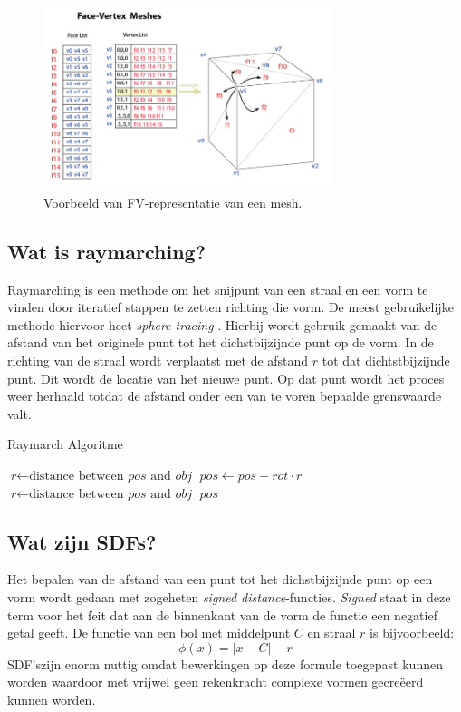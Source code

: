 \documentclass[12pt, a4paper]{article}
\begin{document}
\begin{figure}[H]
    \centering
    \includegraphics[width=0.75\textwidth]{Face-Vertex_Meshes.jpg}
    \caption{Voorbeeld van FV-representatie van een mesh.}
    \label{fig:face_vertex}
\end{figure}

\subsection{Wat is raymarching?}
Raymarching is een methode om het snijpunt van een straal en een vorm te vinden door iteratief stappen te zetten richting die vorm. De meest gebruikelijke methode hiervoor heet \textit{sphere tracing} \cite{SphereTracing}. Hierbij wordt gebruik gemaakt van de afstand van het originele punt tot het dichstbijzijnde punt op de vorm. In de richting van de straal wordt verplaatst met de afstand \(r\) tot dat dichtstbijzijnde punt. Dit wordt de locatie van het nieuwe punt. Op dat punt wordt het proces weer herhaald totdat de afstand onder een van te voren bepaalde grenswaarde valt.
\begin{algorithm}
\caption{Raymarch Algoritme}
\begin{algorithmic}[1]
\State $\textit{r} \gets \text{distance between }\textit{pos}\text{ and }\textit{obj}$
\State $\textit{pos} \gets \textit{pos} + \textit{rot} \cdot r$
\State $\textit{r} \gets \text{distance between }\textit{pos}\text{ and }\textit{obj}$
\EndWhile
\Return $\textit{pos}$
\EndProcedure
\end{algorithmic}
\end{algorithm}


\subsection{Wat zijn SDFs?}
Het bepalen van de afstand van een punt tot het dichstbijzijnde punt op een vorm wordt gedaan met zogeheten \emph{signed distance}-functies. \emph{Signed} staat in deze term voor het feit dat aan de binnenkant van de vorm de functie een negatief getal geeft. De functie van een bol met middelpunt \(C\) en straal \(r\) is bijvoorbeeld:
\[\phi (x)=\left |x-C \right | -r\]
SDF'szijn enorm nuttig omdat bewerkingen op deze formule toegepast kunnen worden waardoor met vrijwel geen rekenkracht complexe vormen gecreëerd kunnen worden. 
\end{document}
